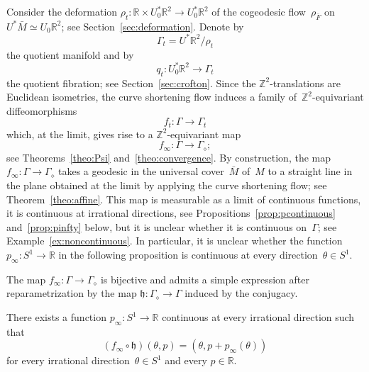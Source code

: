 \documentclass[AHL,Unicode,longabstracts,published]{cedram}
\newcommand{\Z}{\mathbb{Z}}
\newcommand{\R}{\mathbb{R}}
\newcommand{\bh}{\mathfrak{h}}
\begin{document}
Consider the deformation $\rho_t:\R \times U_0^*\R^2 \to U_0^*\R^2$ of the cogeodesic flow~$\rho_{\bar{F}}$ on~$U^*\bar{M} \simeq U_0\R^2$; see Section~\ref{sec:deformation}. Denote by
\[
\Gamma_t = U^*\R^2/\rho_t
\]
the quotient manifold and by
\[
q_t:U_0^*\R^2 \to \Gamma_t
\]
the quotient fibration; see Section~\ref{sec:crofton}. Since the $\Z^2$-translations are Euclidean isometries, the curve shortening flow induces a family of~$\Z^2$-equivariant diffeomorphisms
\begin{equation}\label{eq:ft}
f_t:\Gamma \to \Gamma_t
\end{equation}
which, at the limit, gives rise to a $\Z^2$-equivariant map
\[
f_\infty:\Gamma \to \Gamma_\diamond;
\]
see Theorems~\ref{theo:Psi} and~\ref{theo:convergence}. By construction, the map $f_\infty:\Gamma \to \Gamma_\diamond$ takes a geodesic in the universal cover~$\bar{M}$ of~$M$ to a straight line in the plane obtained at the limit by applying the curve shortening flow; see Theorem~\ref{theo:affine}. This map is measurable as a limit of continuous functions, it is continuous at irrational directions, see Propositions~\ref{prop:pcontinuous} and~\ref{prop:pinfty} below, but it is unclear whether it is continuous on~$\Gamma$; see Example~\ref{ex:noncontinuous}. In particular, it is unclear whether the function $p_\infty:S^1 \to \R$ in the following proposition is continuous at every direction~$\theta \in S^1$.

The map $f_\infty:\Gamma \to \Gamma_\diamond$ is bijective and admits a simple expression after reparametri\-zation by the map $\bh:\Gamma_\diamond \to \Gamma$ induced by the conjugacy.

\begin{prop}\label{prop:pinfty}
There exists a function $p_\infty:S^1 \to \R$ continuous at every irrational direction such that
\[
\left(f_\infty \circ \bh\right)(\theta,p) = \left(\theta,p+p_\infty(\theta)\right)
\]
for every irrational direction~$\theta \in S^1$ and every $p \in \R$.
\end{prop}
\end{document}
